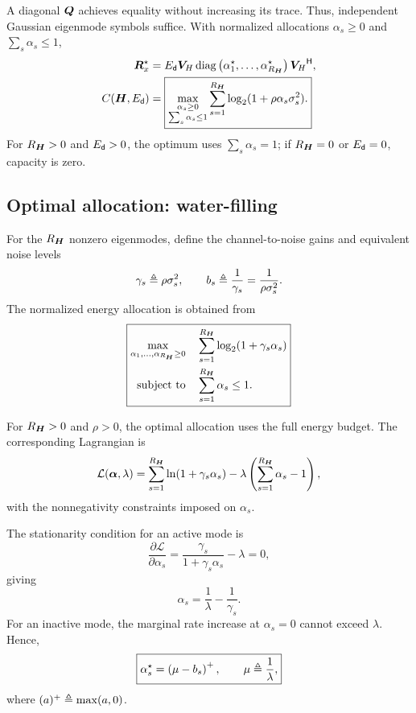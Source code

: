 A diagonal $\bm{Q}$ achieves equality without increasing its trace. Thus, independent Gaussian eigenmode symbols suffice. With normalized allocations $\alpha_s\geq0$ and $\sum_s\alpha_s\leq1$,
\begin{align}
	\bm{R}_x^\star
	&=E_{\mathsf{d}}\bm{V}_{H}\operatorname{diag}\left(\alpha_1^\star,\ldots,\alpha_{R_{\bm{H}}}^\star\right)
	{\bm{V}_{H}}^{\mathsf{H}},\nonumber\\
	C(\bm{H},E_{\mathsf{d}})
	&=\boxed{\max_{\substack{\alpha_s\geq0\\\sum_s\alpha_s\leq1}}
		\sum_{s=1}^{R_{\bm{H}}}\log_2(1+\rho\alpha_s\sigma_s^2).}
	\label{eq:poweroptimization}
\end{align}
For $R_{\bm{H}}>0$ and $E_{\mathsf{d}}>0$, the optimum uses $\sum_s\alpha_s=1$; if $R_{\bm{H}}=0$ or $E_{\mathsf{d}}=0$, capacity is zero.


\subsection{Optimal allocation: water-filling}
\label{sec:water}

For the $R_{\bm{H}}$ nonzero eigenmodes, define the channel-to-noise gains and equivalent noise levels
\begin{equation*}
	\gamma_s\triangleq\rho\sigma_s^2,
	\qquad
	b_s\triangleq\frac{1}{\gamma_s}
	=\frac{1}{\rho\sigma_s^2}.
\end{equation*}
The normalized energy allocation is obtained from
\begin{equation}\label{eq:water-optimization}
	\boxed{
		\begin{aligned}
			\max_{\alpha_1,\ldots,\alpha_{R_{\bm{H}}}\geq0}
			&\quad
			\sum_{s=1}^{R_{\bm{H}}}\log_2(1+\gamma_s\alpha_s)\\
			\text{subject to}
			&\quad \sum_{s=1}^{R_{\bm{H}}}\alpha_s\leq1.
	\end{aligned}}
\end{equation}

For $R_{\bm{H}}>0$ and $\rho>0$, the optimal allocation uses the full energy budget. The corresponding Lagrangian is
\begin{equation*}
	\mathcal{L}(\bm{\alpha},\lambda)
	=
	\sum_{s=1}^{R_{\bm{H}}}\ln(1+\gamma_s\alpha_s)
	-\lambda\left(\sum_{s=1}^{R_{\bm{H}}}\alpha_s-1\right),
\end{equation*}
with the nonnegativity constraints imposed on $\alpha_s$.

The stationarity condition for an active mode is
\begin{equation*}
	\frac{\partial\mathcal{L}}{\partial\alpha_s}
	=
	\frac{\gamma_s}{1+\gamma_s\alpha_s}
	-\lambda=0,
\end{equation*}
giving
\begin{equation*}
	\alpha_s=\frac{1}{\lambda}-\frac{1}{\gamma_s}.
\end{equation*}
For an inactive mode, the marginal rate increase at
$\alpha_s=0$ cannot exceed $\lambda$. Hence,
\begin{equation}\label{eq:water}
	\boxed{
		\alpha_s^\star
		=\left(\mu-b_s\right)^+,
		\qquad
		\mu\triangleq\frac{1}{\lambda},
	}
\end{equation}
where $(a)^+\triangleq\max(a,0)$.

